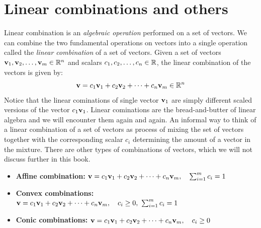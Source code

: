 \section{Linear combinations and others}
Linear combination is an \textit{algebraic operation} performed on a set of vectors. We can combine the two fundamental operations on vectors into a single operation called the \textit{linear combination} of a set of vectors. Given a set of vectors $\mathbf{v}_1, \mathbf{v}_2, \ldots, \mathbf{v}_m \in \mathbb{R}^n$ and scalars $c_1, c_2, \ldots, c_n \in \mathbb{R}$, the linear combination of the vectors is given by:
\begin{equation}
    \mathbf{v} = c_1 \mathbf{v}_1 + c_2 \mathbf{v}_2 + \cdots + c_n \mathbf{v}_m \in \mathbb{R}^n
    \label{eq:linear-comb}
\end{equation}
Notice that the linear cominations of single vector $\mathbf{v}_1$ are simply different scaled versions of the vector $c_1 \mathbf{v}_1$. Linear cominations are the bread-and-butter of linear algebra and we will encounter them again and again. An informal way to think of a linear combination of a set of vectors as process of mixing the set of vectors together with the corresponding scalar $c_i$ determining the amount of a vector in the mixture. There are other types of combinations of vectors, which we will not discuss further in this book.
\begin{itemize}
    \item \textbf{Affine combination:} $\mathbf{v} = c_1 \mathbf{v}_1 + c_2 \mathbf{v}_2 + \cdots + c_n \mathbf{v}_m, \quad \sum_{i=1}^{m} c_i = 1$
    \item \textbf{Convex combinations:} $\mathbf{v} = c_1 \mathbf{v}_1 + c_2 \mathbf{v}_2 + \cdots + c_n \mathbf{v}_m, \quad c_i \geq 0, \,\, \sum_{i=1}^{m} c_i = 1$
    \item \textbf{Conic combinations:} $\mathbf{v} = c_1 \mathbf{v}_1 + c_2 \mathbf{v}_2 + \cdots + c_n \mathbf{v}_m, \quad c_i \geq 0$
\end{itemize}

